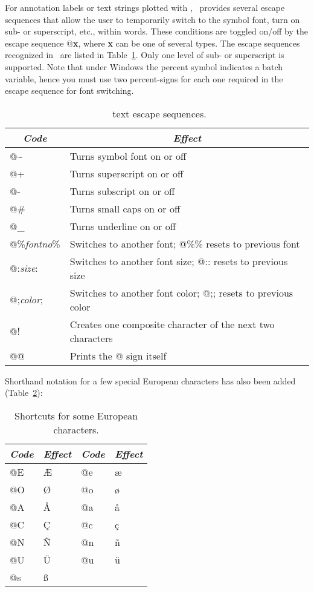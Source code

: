 For annotation labels or text strings plotted with ,
\GMT\ provides several escape sequences that allow the user to
temporarily switch to the symbol font, turn on sub- or superscript,
etc., within words.  These conditions are toggled on/off by the
escape sequence @\textbf{x}, where \textbf{x} can be one of several types.
The escape sequences recognized in \GMT\ are listed in Table~\ref{tbl:escape}.
Only one level of sub- or superscript is supported.
Note that under Windows the percent symbol indicates a batch variable,
hence you must use two percent-signs for each one required in the escape sequence for font switching.

\begin{table}[H]
\centering
\begin{tabular}{|l|l|} \hline
\multicolumn{1}{|c|}{\emph{Code}}	&	\multicolumn{1}{c|}{\emph{Effect}} \\ \hline
@\~	&	Turns symbol font on or off \\ \hline
@+	&	Turns superscript on or off \\ \hline
@-	&	Turns subscript on or off \\ \hline
@\#	&	Turns small caps on or off \\ \hline
@\_	&	Turns underline on or off \\ \hline
@\%\emph{fontno}\%	&	Switches to another font; @\%\% resets to previous font \\ \hline
@:\emph{size}:	&	Switches to another font size; @:: resets to previous size \\ \hline
@;\emph{color};	&	Switches to another font color; @;; resets to previous color \\ \hline
@!	&	Creates one composite character of the next two characters \\ \hline
@@	&	Prints the @ sign itself \\ \hline
\end{tabular}
\caption{\gmt\ text escape sequences.}
\label{tbl:escape}
\end{table}

Shorthand notation for a few special European characters has also been
added (Table~\ref{tbl:scand}):

\begin{table}[H]
\centering
\begin{tabular}{|l|l||l|l|} \hline
\emph{Code} & \emph{Effect}  & \emph{Code} & \emph{Effect} \\ \hline
@E &  \AE   & @e &  \ae   \\ \hline
@O &  \O    & @o &  \o    \\ \hline
@A &  \AA   & @a &  \aa   \\ \hline
@C &  \c{C} & @c &  \c{c} \\ \hline
@N &  \~{N} & @n &  \~{n} \\ \hline
@U &  \"{U} & @u &  \"{u} \\ \hline
@s &  \ss   &    &        \\ \hline
\end{tabular}
\caption{Shortcuts for some European characters.}
\label{tbl:scand}
\end{table}

